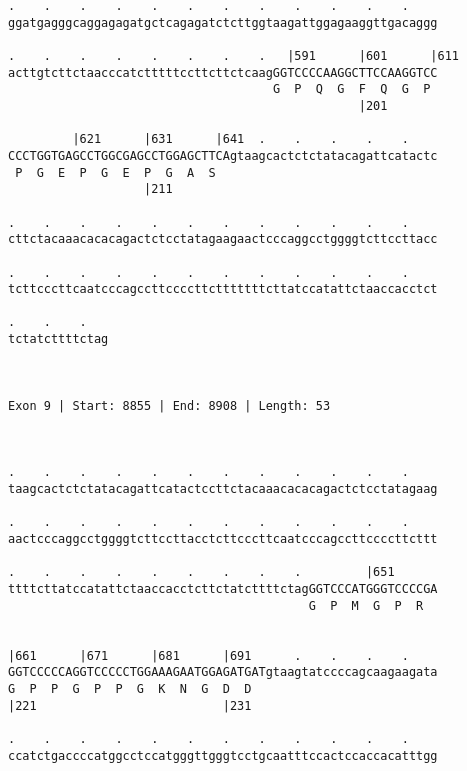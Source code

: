 \documentclass{article}
\begin{document}
\begin{Verbatim}
.    .    .    .    .    .    .    .    .    .    .    .    
ggatgagggcaggagagatgctcagagatctcttggtaagattggagaaggttgacaggg
                                                            
.    .    .    .    .    .    .    .   |591      |601      |611
acttgtcttctaacccatctttttccttcttctcaagGGTCCCCAAGGCTTCCAAGGTCC
                                     G  P  Q  G  F  Q  G  P 
                                                 |201       
  
         |621      |631      |641  .    .    .    .    .    
CCCTGGTGAGCCTGGCGAGCCTGGAGCTTCAgtaagcactctctatacagattcatactc
 P  G  E  P  G  E  P  G  A  S                               
                   |211                                     
  
.    .    .    .    .    .    .    .    .    .    .    .    
cttctacaaacacacagactctcctatagaagaactcccaggcctggggtcttccttacc
                                                            
.    .    .    .    .    .    .    .    .    .    .    .    
tcttcccttcaatcccagccttccccttctttttttcttatccatattctaaccacctct
                                                            
.    .    .   
tctatcttttctag
              
              
 
Exon 9 | Start: 8855 | End: 8908 | Length: 53



.    .    .    .    .    .    .    .    .    .    .    .    
taagcactctctatacagattcatactccttctacaaacacacagactctcctatagaag
                                                            
.    .    .    .    .    .    .    .    .    .    .    .    
aactcccaggcctggggtcttccttacctcttcccttcaatcccagccttccccttcttt
                                                            
.    .    .    .    .    .    .    .    .         |651      
ttttcttatccatattctaaccacctcttctatcttttctagGGTCCCATGGGTCCCCGA
                                          G  P  M  G  P  R  
                                                            
  
|661      |671      |681      |691      .    .    .    .    
GGTCCCCCAGGTCCCCCTGGAAAGAATGGAGATGATgtaagtatccccagcaagaagata
G  P  P  G  P  P  G  K  N  G  D  D                          
|221                          |231                          
  
.    .    .    .    .    .    .    .    .    .    .    .    
ccatctgaccccatggcctccatgggttgggtcctgcaatttccactccaccacatttgg
                                                            

\end{Verbatim}
\end{document}
